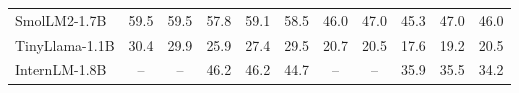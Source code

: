 \documentclass[letterpaper]{article} %
\begin{document}
\begin{table}[t]
{\begin{tabular}{lccccc|ccccc}
SmolLM2-1.7B & \cellcolor[HTML]{FAF1CD}59.5 & \cellcolor[HTML]{F4F0CE}59.5 & \cellcolor[HTML]{F6F0CE}57.8 & \cellcolor[HTML]{F2EFCE}59.1 & \cellcolor[HTML]{F4F0CE}58.5 & \cellcolor[HTML]{FFF1CC}46.0 & \cellcolor[HTML]{FAF1CD}47.0 & \cellcolor[HTML]{FBF1CD}45.3 & \cellcolor[HTML]{F5F0CE}47.0 & \cellcolor[HTML]{F8F0CD}46.0 \\
TinyLlama-1.1B & \cellcolor[HTML]{F4CCCC}30.4 & \cellcolor[HTML]{F4CCCC}29.9 & \cellcolor[HTML]{F4CCCC}25.9 & \cellcolor[HTML]{F5D0CC}27.4 & \cellcolor[HTML]{F6D2CC}29.5 & \cellcolor[HTML]{F4CCCC}20.7 & \cellcolor[HTML]{F4CCCC}20.5 & \cellcolor[HTML]{F4CCCC}17.6 & \cellcolor[HTML]{F6D1CC}19.2 & \cellcolor[HTML]{F6D3CC}20.5 \\
InternLM-1.8B & -- & -- & \cellcolor[HTML]{FDEACC}46.2 & \cellcolor[HTML]{FDECCC}46.2 & \cellcolor[HTML]{FCE9CC}44.7 & -- & -- & \cellcolor[HTML]{FCE8CC}35.9 & \cellcolor[HTML]{FDEACC}35.5 & \cellcolor[HTML]{FCE8CC}34.2 \\
\bottomrule
\end{tabular}%
}
\end{table}
\end{document}
